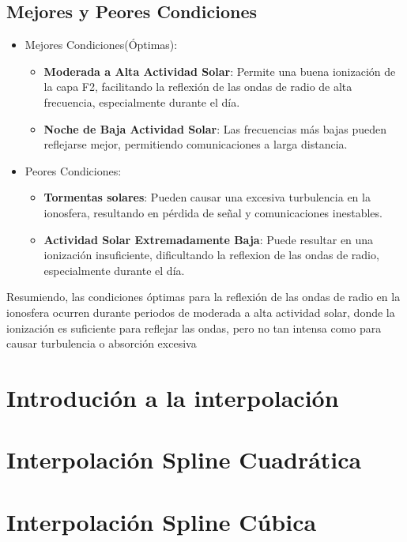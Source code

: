 \documentclass[12pt]{article}
\begin{document}
\subsection{ Mejores y Peores Condiciones}
\begin{itemize}
  \item Mejores Condiciones(Óptimas):
    \begin{itemize}
      \item \textbf{Moderada a Alta Actividad Solar}: Permite una buena io\-ni\-zación de la capa F2, 
      facilitando la reflexión de las ondas de radio de alta frecuencia, especialmente durante el 
      día.
      \item \textbf{Noche de Baja Actividad Solar}: Las frecuencias más bajas pueden reflejarse
      mejor, permitiendo comunicaciones a larga distancia.
  \end{itemize}
\end{itemize}
\begin{itemize}
  \item Peores Condiciones:
  \begin{itemize}
    \item \textbf{Tormentas solares}: Pueden causar una excesiva turbulencia en la ionosfera, 
    resultando en pérdida de señal y comunicaciones i\-nes\-ta\-bles.
    \item \textbf{Actividad Solar Extremadamente Baja}: Puede resultar en una ionización 
    insuficiente, dificultando la reflexion de las ondas de radio, especialmente durante el día.
  \end{itemize} 
\end{itemize}
Resumiendo, las condiciones óptimas para la reflexión de las ondas de radio en la ionosfera 
ocurren durante periodos de moderada a alta actividad solar, donde la ionización es suficiente para
reflejar las ondas, pero no tan intensa como para causar turbulencia o absorción excesiva


\section{Introdución a la interpolación}
  
\section{Interpolación Spline Cuadrática}
  
\section{Interpolación Spline Cúbica}
  
\end{document}
